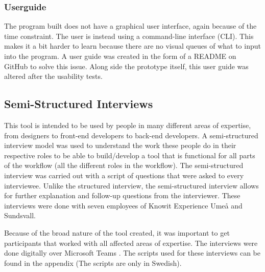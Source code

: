 \subsubsection{Userguide}%
\label{ssub:Userguide}
The program built does not have a graphical user interface, again because of the time constraint. The user is instead using a command-line interface (CLI). This makes it a bit harder to learn because there are no visual queues of what to input into the program.  A user guide was created in the form of a README on GitHub\cite{BuildSoftwareBetter} to solve this issue. Along side the prototype itself, this user guide was altered after the usability tests.



\subsection{Semi-Structured Interviews}%
\label{sub:inteviews}
This tool is intended to be used by people in many different areas of expertise, from designers to front-end developers to back-end developers. A semi-structured interview model was used \cite{galletta2013mastering} to understand the work these people do in their respective roles to be able to build/develop a tool that is functional for all parts of the workflow (all the different roles in the workflow). The semi-structured interview was carried out with a script of questions that were asked to every interviewee. Unlike the structured interview, the semi-structured interview allows for further explanation and follow-up questions from the interviewer. These interviews were done with seven employees of Knowit Experience Umeå and Sundsvall. 

Because of the broad nature of the tool created, it was important to get participants that worked with all affected areas of expertise. The interviews were done digitally over Microsoft Teams \cite{VideoConferencingMeetings}. The scripts used for these interviews can be found in the appendix (The scripts are only in Swedish). 






